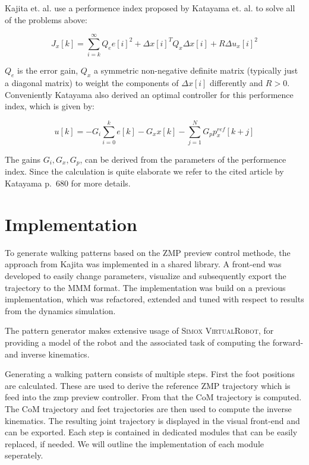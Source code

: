 \documentclass[english,ngerman]{KITreprt}
\newcommand{\clr}[2]{{\color{#1}{#2}}}
\newcommand{\todo}[1]{\marginpar{\clr{red}{#1}}}
\newcommand{\name}[1]{\textsc{#1}}
\begin{document}
\todo{add citation katayama} Kajita et. al. use a performence index
proposed by Katayama et. al. to solve all of the problems above:

\begin{equation}
J_x[k] = \sum^{\infty}_{i=k} Q_e e[i]^2 + \Delta x[i]^T Q_x \Delta x[i] + R \Delta u_x[i]^2
\end{equation}

$Q_e$ is the error gain, $Q_x$ a symmetric non-negative definite matrix
(typically just a diagonal matrix) to weight the components of
$\Delta x[i]$ differently and $R > 0$. Conveniently Katayama also
derived an optimal controller for this performence index, which is given
by:

\begin{equation}
u[k] = -G_i \sum^k_{i=0} e[k] - G_x x[k] - \sum^N_{j=1} G_p p^{ref}_x[k + j]
\end{equation}

The gains $G_i, G_x, G_p$, can be derived from the parameters of the
performence index. Since the calculation is quite elaborate we refer to
the cited article by Katayama p.~680 for more details.

\section{Implementation}\label{implementation}

\todo{block diagramm of architechture} To generate walking patterns
based on the ZMP preview control methode, the approach from Kajita was
implemented in a shared library. A front-end was developed to easily
change parameters, visualize and subsequently export the trajectory to
the \name{MMM} format. The implementation was build on a previous
implementation, which was refactored, extended and tuned with respect to
results from the dynamics simulation.

The pattern generator makes extensive usage of
\name{Simox VirtualRobot}, for providing a model of the robot and the
associated task of computing the forward- and inverse kinematics.

Generating a walking pattern consists of multiple steps. First the foot
positions are calculated. These are used to derive the reference ZMP
trajectory which is feed into the zmp preview controller. From that the
CoM trajectory is computed. The CoM trajectory and feet trajectories are
then used to compute the inverse kinematics. The resulting joint
trajectory is displayed in the visual front-end and can be exported.
Each step is contained in dedicated modules that can be easily replaced,
if needed. We will outline the implementation of each module seperately.
\end{document}

